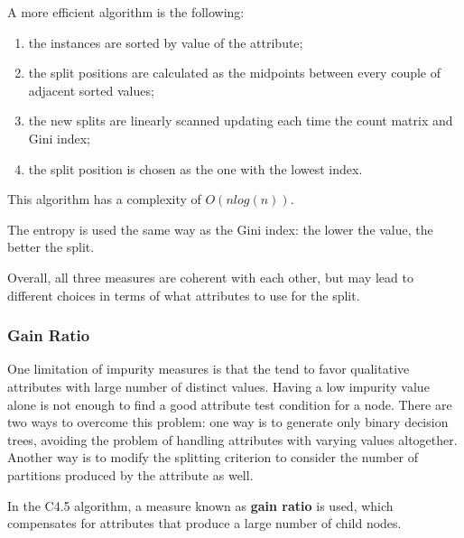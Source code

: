 A more efficient algorithm is the following:
\begin{enumerate}
    \item the instances are sorted by value of the attribute;

    \item the split positions are calculated as the midpoints between every couple of adjacent sorted values;

    \item the new splits are linearly scanned updating each time the count matrix and Gini index;

    \item the split position is chosen as the one with the lowest index.
\end{enumerate}
This algorithm has a complexity of $O(nlog(n))$.


The entropy is used the same way as the Gini index: the lower the value, the better the split.


Overall, all three measures are coherent with each other, but may lead to different choices in terms of what attributes to use for the split. 

\subsubsection{Gain Ratio}

One limitation of impurity measures is that the tend to favor qualitative attributes with large number of distinct values. Having a low impurity value alone is not enough to find a good attribute test condition for a node. There are two ways to overcome this problem: one way is to generate only binary decision trees, avoiding the problem of handling attributes with varying values altogether. Another way is to modify the splitting criterion to consider the number of partitions produced by the attribute as well.

In the C4.5 algorithm, a measure known as \textbf{gain ratio} is used, which compensates for attributes that produce a large number of child nodes.

